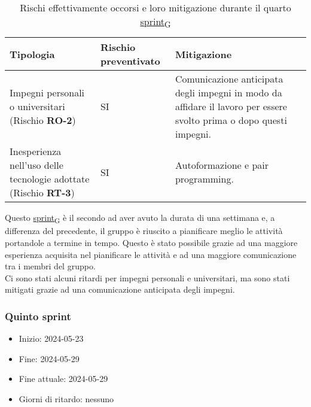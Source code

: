 \begin{table}[!h]
	\centering
	\begin{tabular}{ | p{6cm} | p{2.5cm} | p{7.5cm} | }
		\hline
		\textbf{Tipologia}                                                      & \textbf{Rischio preventivato} & \textbf{Mitigazione}                                                                                                \\
		\hline
		Impegni personali o universitari (Rischio \textbf{RO-2})                & SI                            & Comunicazione anticipata degli impegni in modo da affidare il lavoro per essere svolto prima o dopo questi impegni. \\
		\hline
		Inesperienza nell'uso delle tecnologie adottate (Rischio \textbf{RT-3}) & SI                            & Autoformazione e pair programming.                                                                                  \\
		\hline
	\end{tabular}
	\caption{Rischi effettivamente occorsi e loro mitigazione durante il quarto \href{https://7last.github.io/docs/pb/documentazione-interna/glossario\#sprint}{sprint\textsubscript{G}}}
	
\end{table}
\newpage
{}
Questo \href{https://7last.github.io/docs/pb/documentazione-interna/glossario\#sprint}{sprint\textsubscript{G}} è il secondo ad aver avuto la durata di una settimana e, a differenza del precedente, il gruppo è riuscito
a pianificare meglio le attività portandole a termine in tempo.
Questo è stato possibile grazie ad una maggiore esperienza acquisita nel pianificare le attività e ad una maggiore
comunicazione tra i membri del gruppo.\\
Ci sono stati alcuni ritardi per impegni personali e universitari, ma sono stati mitigati grazie ad una comunicazione
anticipata degli impegni.



\subsubsection{Quinto sprint} 
\begin{itemize}
    \item Inizio: 2024-05-23
    \item Fine: 2024-05-29 
    \item Fine attuale: 2024-05-29
	\item Giorni di ritardo: nessuno
\end{itemize}

